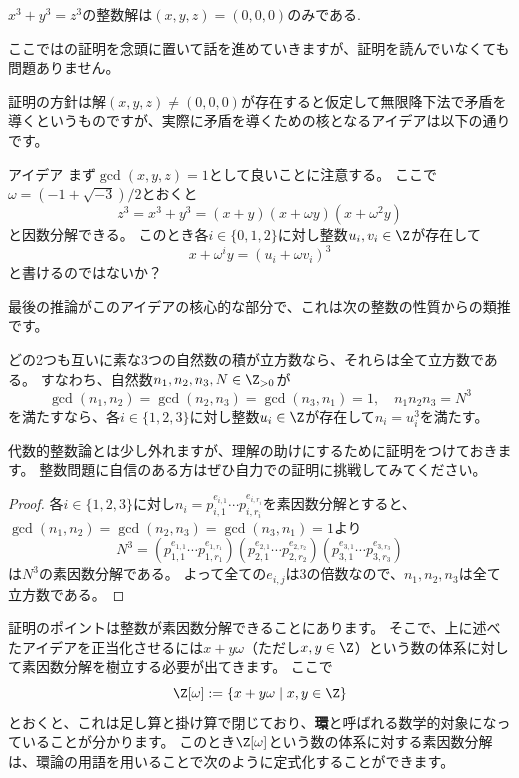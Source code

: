 \documentclass[11pt,b5paper,oneside,titlepage,lualatex]{ltjsreport}
\begin{document}
\begin{theorem}{}{}
	$ x^3 + y^3 = z^3 $の整数解は$ (x, y, z) = (0, 0, 0) $のみである.
\end{theorem}

ここでは\cite[系8.7.6]{Yukie1}の証明を念頭に置いて話を進めていきますが、証明を読んでいなくても問題ありません。

証明の方針は解$ (x, y, z) \neq (0, 0, 0) $が存在すると仮定して無限降下法で矛盾を導くというものですが、実際に矛盾を導くための核となるアイデアは以下の通りです。

\begin{simplesquarebox}{アイデア}
	まず$ \gcd(x, y, z) = 1 $として良いことに注意する。
	ここで$ \omega = (-1+\sqrt{-3})/2 $とおくと
	\[
	z^3 = x^3 + y^3 = (x + y) (x + \omega y) (x + \omega^2 y)
	\]
	と因数分解できる。
	このとき各$ i \in \{ 0, 1, 2 \} $に対し整数$ u_i, v_i \in \Z $が存在して
	\[
	x + \omega^i y = (u_i + \omega v_i)^3
	\]
	と書けるのではないか？
\end{simplesquarebox}

最後の推論がこのアイデアの核心的な部分で、これは次の整数の性質からの類推です。

\begin{lemma}{}{}
	どの2つも互いに素な3つの自然数の積が立方数なら、それらは全て立方数である。
	すなわち、自然数$ n_1, n_2, n_3, N \in \Z_{>0} $が
	\[
	\gcd(n_1, n_2) = \gcd(n_2, n_3) = \gcd(n_3, n_1) = 1, \quad
	n_1 n_2 n_3 = N^3
	\]
	を満たすなら、各$ i \in \{ 1, 2, 3 \} $に対し整数$ u_i \in \Z $が存在して$ n_i = u_i^3 $を満たす。
\end{lemma}

代数的整数論とは少し外れますが、理解の助けにするために証明をつけておきます。
整数問題に自信のある方はぜひ自力での証明に挑戦してみてください。

\begin{proof}
	各$ i \in \{ 1, 2, 3 \} $に対し$ n_i = p_{i, 1}^{e_{i, 1}} \cdots p_{i, r_i}^{e_{i, r_i}} $を素因数分解とすると、
	$ \gcd(n_1, n_2) = \gcd(n_2, n_3) = \gcd(n_3, n_1) = 1 $より
	\[
	N^3 = \left( p_{1, 1}^{e_{1, 1}} \cdots p_{1, r_1}^{e_{1, r_1}} \right) \left( p_{2, 1}^{e_{2, 1}} \cdots p_{2, r_2}^{e_{2, r_2}} \right) \left( p_{3, 1}^{e_{3, 1}} \cdots p_{3, r_3}^{e_{3, r_3}} \right)
	\]
	は$ N^3 $の素因数分解である。
	よって全ての$ e_{i, j} $は3の倍数なので、$ n_1, n_2, n_3 $は全て立方数である。
\end{proof}

証明のポイントは整数が素因数分解できることにあります。
そこで、上に述べたアイデアを正当化させるには$ x + y\omega $（ただし$ x, y \in \Z $）という数の体系に対して素因数分解を樹立する必要が出てきます。
ここで
\[
\Z[\omega] := \{ x + y\omega \mid x, y \in \Z \}
\]
とおくと、これは足し算と掛け算で閉じており、\textbf{環}と呼ばれる数学的対象になっていることが分かります。
このとき$ \Z[\omega] $という数の体系に対する素因数分解は、環論の用語を用いることで次のように定式化することができます。
\end{document}
